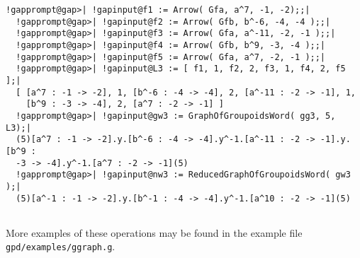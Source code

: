 \documentclass[a4paper,11pt]{report}
\begin{document}
{{\begin{Verbatim}[commandchars=!@|,fontsize=\small,frame=single,label=Example]
  !gapprompt@gap>| !gapinput@f1 := Arrow( Gfa, a^7, -1, -2);;|
  !gapprompt@gap>| !gapinput@f2 := Arrow( Gfb, b^-6, -4, -4 );;|
  !gapprompt@gap>| !gapinput@f3 := Arrow( Gfa, a^-11, -2, -1 );;|
  !gapprompt@gap>| !gapinput@f4 := Arrow( Gfb, b^9, -3, -4 );;|
  !gapprompt@gap>| !gapinput@f5 := Arrow( Gfa, a^7, -2, -1 );;|
  !gapprompt@gap>| !gapinput@L3 := [ f1, 1, f2, 2, f3, 1, f4, 2, f5 ];|
  [ [a^7 : -1 -> -2], 1, [b^-6 : -4 -> -4], 2, [a^-11 : -2 -> -1], 1, 
    [b^9 : -3 -> -4], 2, [a^7 : -2 -> -1] ]
  !gapprompt@gap>| !gapinput@gw3 := GraphOfGroupoidsWord( gg3, 5, L3);|
  (5)[a^7 : -1 -> -2].y.[b^-6 : -4 -> -4].y^-1.[a^-11 : -2 -> -1].y.[b^9 : 
  -3 -> -4].y^-1.[a^7 : -2 -> -1](5)
  !gapprompt@gap>| !gapinput@nw3 := ReducedGraphOfGroupoidsWord( gw3 );|
  (5)[a^-1 : -1 -> -2].y.[b^-1 : -4 -> -4].y^-1.[a^10 : -2 -> -1](5)
  
\end{Verbatim}
 }

 More examples of these operations may be found in the example file \texttt{gpd/examples/ggraph.g}. }

            
\end{document}

